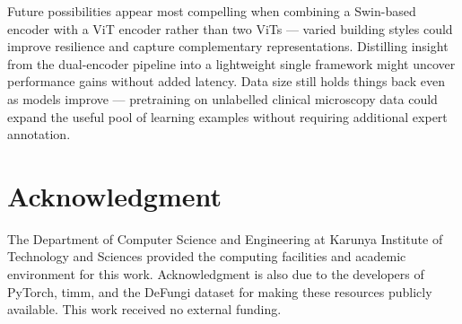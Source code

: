 \documentclass[conference]{IEEEtran}
\begin{document}
Future possibilities appear most compelling when combining a Swin-based
encoder with a ViT encoder rather than two ViTs --- varied building styles
could improve resilience and capture complementary representations. Distilling
insight from the dual-encoder pipeline into a lightweight single framework
might uncover performance gains without added latency. Data size still holds
things back even as models improve --- pretraining on unlabelled clinical
microscopy data could expand the useful pool of learning examples without
requiring additional expert annotation.

\section*{Acknowledgment}

The Department of Computer Science and Engineering at Karunya Institute of
Technology and Sciences provided the computing facilities and academic
environment for this work. Acknowledgment is also due to the developers of
PyTorch, timm, and the DeFungi dataset for making these resources publicly
available. This work received no external funding.
\end{document}
